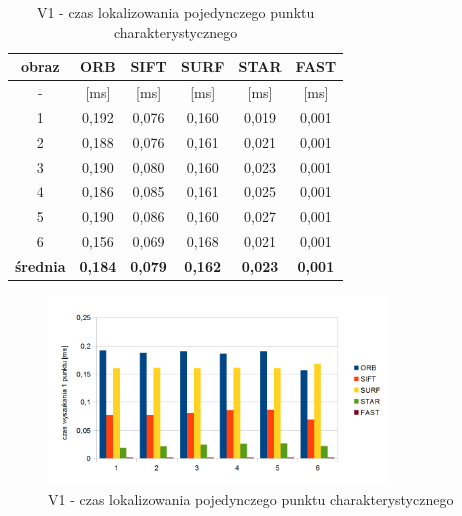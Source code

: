 \begin{table}[htbp]
  \centering
  \caption{V1 - czas lokalizowania pojedynczego punktu charakterystycznego}
    \begin{tabular}{|c|c|c|c|c|c|}
    \hline
    obraz & \textbf{ORB} & \textbf{SIFT} & \textbf{SURF} & \textbf{STAR} & \textbf{FAST} \\
    \hline
    -  & [ms] & [ms] & [ms] & [ms] & [ms] \\\hline
    1 & 0,192 & 0,076 & 0,160 & 0,019 & 0,001 \\
    2 & 0,188 & 0,076 & 0,161 & 0,021 & 0,001 \\
    3 & 0,190 & 0,080 & 0,160 & 0,023 & 0,001 \\
    4 & 0,186 & 0,085 & 0,161 & 0,025 & 0,001 \\
    5 & 0,190 & 0,086 & 0,160 & 0,027 & 0,001 \\
    6 & 0,156 & 0,069 & 0,168 & 0,021 & 0,001 \\\hline
    \textbf{średnia} & \textbf{0,184} & \textbf{0,079} & \textbf{0,162} & \textbf{0,023} & \textbf{0,001} \\
    \hline
    \end{tabular}%
  \label{tab:v1_f2}%
\end{table}%


\begin{figure}
\centering
\includegraphics[width=0.8\textwidth]{pict/slowik/v1/f2.png}
\caption{V1 - czas lokalizowania pojedynczego punktu charakterystycznego}
\label{fig:v1_f2}
\end{figure}

